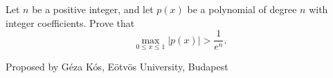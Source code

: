 Let $n$ be a positive integer, and let $p(x)$ be a polynomial of
degree $n$ with integer coefficients.  Prove that
$$
\max_{0\le x\le1} \big|p(x)\big| > \frac1{e^n}.
$$

Proposed by Géza Kós, Eötvös University, Budapest
